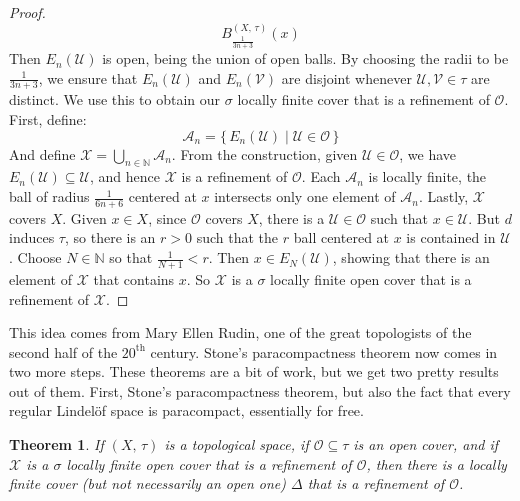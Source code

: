 \documentclass{article}
\theoremstyle{plain}
\newtheorem{theorem}{Theorem}[section]
\theoremstyle{normal}
\begin{document}
\begin{proof}
\begin{equation}
                B_{\frac{1}{3n+3}}^{(X,\,\tau)}(x)
            \end{equation}
            Then $E_{n}(\mathcal{U})$ is open, being the union of open balls.
            By choosing the radii to be $\frac{1}{3n+3}$, we ensure that
            $E_{n}(\mathcal{U})$ and $E_{n}(\mathcal{V})$ are disjoint
            whenever $\mathcal{U},\mathcal{V}\in\tau$ are distinct. We use
            this to obtain our $\sigma$ locally finite cover that is a
            refinement of $\mathcal{O}$. First, define:
            \begin{equation}
                \mathcal{A}_{n}=
                \{\,E_{n}(\mathcal{U})\;|\;\mathcal{U}\in\mathcal{O}\,\}
            \end{equation}
            And define $\mathcal{X}=\bigcup_{n\in\mathbb{N}}\mathcal{A}_{n}$.
            From the construction, given $\mathcal{U}\in\mathcal{O}$, we have
            $E_{n}(\mathcal{U})\subseteq\mathcal{U}$, and hence
            $\mathcal{X}$ is a refinement of $\mathcal{O}$. Each
            $\mathcal{A}_{n}$ is locally finite, the ball of radius
            $\frac{1}{6n+6}$ centered at $x$ intersects only one element of
            $\mathcal{A}_{n}$. Lastly, $\mathcal{X}$ covers $X$. Given
            $x\in{X}$, since $\mathcal{O}$ covers $X$, there is a
            $\mathcal{U}\in\mathcal{O}$ such that $x\in\mathcal{U}$. But
            $d$ induces $\tau$, so there is an $r>0$ such that
            the $r$ ball centered at $x$ is contained in $\mathcal{U}$. Choose
            $N\in\mathbb{N}$ so that $\frac{1}{N+1}<r$. Then
            $x\in{E}_{N}(\mathcal{U})$, showing that there is an element of
            $\mathcal{X}$ that contains $x$. So $\mathcal{X}$ is a
            $\sigma$ locally finite open cover that is a refinement of
            $\mathcal{X}$.
        \end{proof}
        This idea comes from Mary Ellen Rudin, one of the great topologists of
        the second half of the $20^{\textrm{th}}$ century. Stone's
        paracompactness theorem now comes in two more steps. These
        theorems are a bit of work, but we get two pretty results out of
        them. First, Stone's paracompactness theorem, but also the fact that
        every regular Lindel\"{o}f space is paracompact, essentially for free.
        \begin{theorem}
            If $(X,\,\tau)$ is a topological space, if
            $\mathcal{O}\subseteq\tau$ is an
            open cover, and if $\mathcal{X}$ is a $\sigma$ locally finite open
            cover that is a refinement of $\mathcal{O}$, then there is a
            locally finite cover (but not necessarily an open one)
            $\Delta$ that is a refinement of $\mathcal{O}$.
        \end{theorem}
\end{document}
